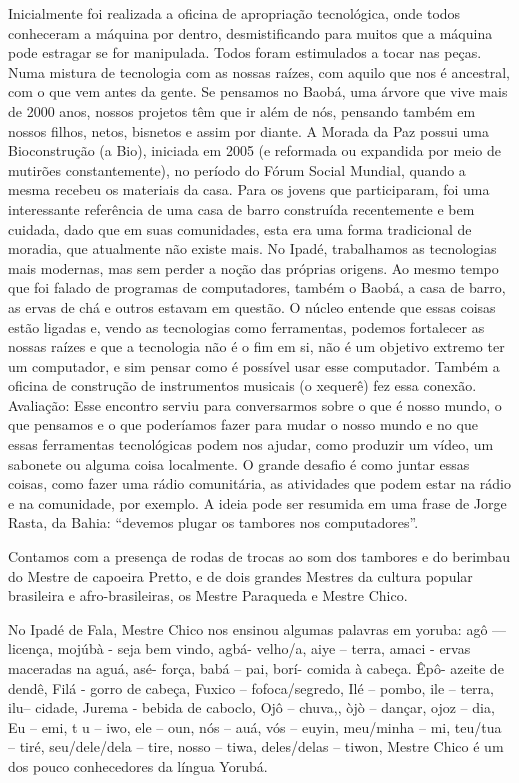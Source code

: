 \documentclass[a4paper, 11pt, oneside]{Relatorio_sem}  %
\begin{document}
Inicialmente foi realizada a oficina de apropriação tecnológica, onde
todos conheceram a máquina por dentro, desmistificando para muitos que
a máquina pode estragar se for manipulada. Todos foram estimulados a
tocar nas peças.  Numa mistura de tecnologia com as nossas raízes, com
aquilo que nos é ancestral, com o que vem antes da gente. Se pensamos
no Baobá, uma árvore que vive mais de 2000 anos, nossos projetos têm
que ir além de nós, pensando também em nossos filhos, netos, bisnetos
e assim por diante.  A Morada da Paz possui uma Bioconstrução (a Bio),
iniciada em 2005 (e reformada ou expandida por meio de mutirões
constantemente), no período do Fórum Social Mundial, quando a mesma
recebeu os materiais da casa. Para os jovens que participaram, foi uma
interessante referência de uma casa de barro construída recentemente e
bem cuidada, dado que em suas comunidades, esta era uma forma
tradicional de moradia, que atualmente não existe mais.  No Ipadé,
trabalhamos as tecnologias mais modernas, mas sem perder a noção das
próprias origens. Ao mesmo tempo que foi falado de programas de
computadores, também o Baobá, a casa de barro, as ervas de chá e
outros estavam em questão. O núcleo entende que essas coisas estão
ligadas e, vendo as tecnologias como ferramentas, podemos fortalecer
as nossas raízes e que a tecnologia não é o fim em si, não é um
objetivo extremo ter um computador, e sim pensar como é possível usar
esse computador. Também a oficina de construção de instrumentos
musicais (o xequerê) fez essa conexão.  Avaliação: Esse encontro
serviu para conversarmos sobre o que é nosso mundo, o que pensamos e o
que poderíamos fazer para mudar o nosso mundo e no que essas
ferramentas tecnológicas podem nos ajudar, como produzir um vídeo, um
sabonete ou alguma coisa localmente. O grande desafio é como juntar
essas coisas, como fazer uma rádio comunitária, as atividades que
podem estar na rádio e na comunidade, por exemplo. A ideia pode ser
resumida em uma frase de Jorge Rasta, da Bahia: “devemos plugar os
tambores nos computadores”.

Contamos com a presença de rodas de trocas ao som dos tambores e do
berimbau do Mestre de capoeira Pretto, e de dois grandes Mestres da
cultura popular brasileira e afro-brasileiras, os Mestre Paraqueda e
Mestre Chico.

No Ipadé de Fala, Mestre Chico nos ensinou algumas palavras em yoruba: agô
— licença, mojúbà - seja bem vindo, agbá- velho/a, aiye – terra, amaci -
ervas maceradas na aguá, asé- força, babá – pai, borí- comida à cabeça. Êpô-
azeite de dendê, Filá - gorro de cabeça, Fuxico – fofoca/segredo, Ilé – pombo,
ile – terra, ilu-- cidade, Jurema - bebida de caboclo, Ojô – chuva,, òjò –
dançar, ojoz – dia, Eu – emi, t u – iwo, ele – oun, nós – auá, vós – euyin,
meu/minha – mi, teu/tua – tiré, seu/dele/dela – tire, nosso – tiwa,
deles/delas – tiwon, Mestre Chico é um dos pouco conhecedores da
língua Yorubá.
\end{document}
